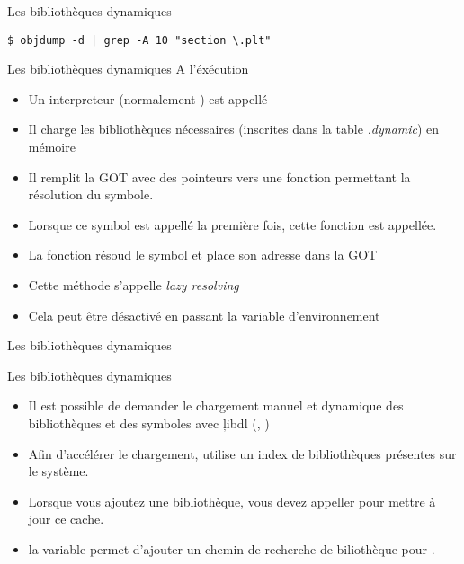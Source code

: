 \begin{frame}[fragile=singleslide]{Les bibliothèques dynamiques}
  \begin{center}
\end{center}
\begin{lstlisting}
$ objdump -d | grep -A 10 "section \.plt"
    \end{lstlisting}
\end{frame}

\begin{frame}[fragile=singleslide]{Les bibliothèques dynamiques}
  A l'éxécution
  \begin{itemize}
  \item Un interpreteur (normalement ) est appellé
  \item  Il charge  les bibliothèques  nécessaires (inscrites  dans la
    table \emph{.dynamic}) en mémoire
  \item  Il  remplit la  GOT  avec  des  pointeurs vers  une  fonction
    permettant la résolution du symbole.
  \item Lorsque ce symbol est appellé la première fois, cette fonction
    est appellée.
  \item La fonction résoud le symbol et place son adresse dans la GOT
  \item Cette méthode s'appelle \emph{lazy resolving}
  \item   Cela   peut   être   désactivé  en   passant   la   variable
    d'environnement 
  \end{itemize}
\end{frame}

\begin{frame}[fragile=singleslide]{Les bibliothèques dynamiques}
\begin{center}
\end{center}
\end{frame}

\begin{frame}[fragile=singleslide]{Les bibliothèques dynamiques}
  \begin{itemize}
  \item Il est possible de  demander le chargement manuel et dynamique
    des    bibliothèques    et    des    symboles    avec    \c{libdl}
    (, )
  \item Afin d'accélérer le  chargement,  utilise un index de
    bibliothèques présentes  sur le  système.
  \item  Lorsque vous  ajoutez une  bibliothèque, vous  devez appeller
     pour mettre à jour ce cache.
  \item la variable   permet d'ajouter un chemin de
    recherche de biliothèque pour .
  \end{itemize}
\end{frame}

